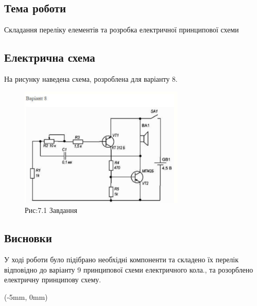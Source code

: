 \documentclass[a4paper]{article}
\begin{document}
\subsection*{Тема роботи}
Складання переліку елементів 
    та розробка електричної 
    принципової схеми
\subsection*{Електрична схема}
На рисунку наведена схема, розроблена для варіанту 8.

\begin{figure}[h]
    \centering
    \includegraphics[width=0.7\textwidth]{imgs/PW7.0.png}
    \caption*{Рис:7.1 Завдання}
\end{figure}


\subsection*{Висновки}
У ході роботи було підібрано необхідні компоненти та складено їх перелік відповідно до варіанту 9 принципової схеми електричного кола., та розорблено електричну принципову схему.

\newpage
\fancyfoot[C]{}

\begin{textblock*}{\paperwidth}(-5mm, 0mm)
\end{textblock*}
\end{document}

